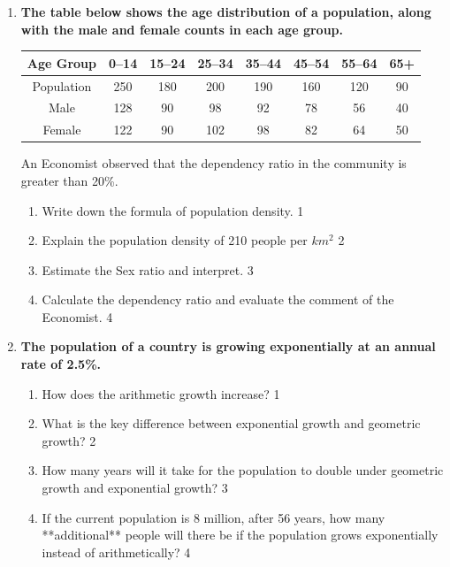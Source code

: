 \documentclass[a4paper,oneside]{book}
\begin{document}
  \begin{enumerate}
  
 \item
  \textbf{The table below shows the age distribution of a population, along with the male and female counts in each age group.}

\begin{table}[h]
\centering
\begin{tabular}{c|c|c|c|c|c|c|c}
Age Group  & 0–14 & 15–24 & 25–34 & 35–44 & 45–54 & 55–64 & 65+ \\ \hline
Population & 250  & 180   & 200   & 190   & 160   & 120   & 90  \\ \hline
Male       & 128  & 90    & 98    & 92    & 78    & 56    & 40  \\
Female     & 122  & 90    & 102   & 98    & 82    & 64    & 50 
\end{tabular}
\end{table}

An Economist observed that the dependency ratio in the community is greater than 20\%.
  
  \begin{enumerate}
    \item
	Write down the formula of population density. \hfill 1
    \item
	Explain the population density of 210 people per $km^2$ \hfill 2
    \item  
	Estimate the Sex ratio and interpret. \hfill 3
    \item
	Calculate the dependency ratio and evaluate the comment of the Economist. \hfill 4
  \end{enumerate}

 \item
  \textbf{The population of a country is growing exponentially at an annual rate of 2.5\%.}

  
  \begin{enumerate}
    \item
	How does the arithmetic growth increase? \hfill 1
    \item
    What is the key difference between exponential growth and geometric growth? \hfill 2
  \item
How many years will it take for the population to double under geometric growth and exponential growth? \hfill 3

\item
If the current population is 8 million, after 56 years, how many **additional** people will there be if the population grows exponentially instead of arithmetically? \hfill 4
  \end{enumerate}


\end{enumerate}
\end{document}
